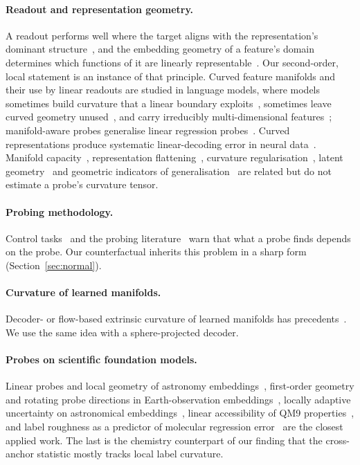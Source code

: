 \documentclass[10pt]{article}
\begin{document}
\paragraph{Readout and representation geometry.} A readout performs well where the target aligns with the representation's dominant structure~\citep{canatar2021spectral}, and the embedding geometry of a feature's domain determines which functions of it are linearly representable~\citep{yocum2026neural}. Our second-order, local statement is an instance of that principle. Curved feature manifolds and their use by linear readouts are studied in language models, where models sometimes build curvature that a linear boundary exploits~\citep{gurnee2026manipulate}, sometimes leave curved geometry unused~\citep{hindupur2026dont}, and carry irreducibly multi-dimensional features~\citep{engels2024notall}; manifold-aware probes generalise linear regression probes~\citep{modell2026probing}. Curved representations produce systematic linear-decoding error in neural data~\citep{jurewicz2024irrational}. Manifold capacity~\citep{chung2016linear,slatton2026linear}, representation flattening~\citep{psenka2024flattening}, curvature regularisation~\citep{ma2023curvature}, latent geometry~\citep{kaufman2023latent} and geometric indicators of generalisation~\citep{chou2026diagnosing} are related but do not estimate a probe's curvature tensor.

\paragraph{Probing methodology.} Control tasks~\citep{hewitt2019control} and the probing literature~\citep{belinkov2022probing} warn that what a probe finds depends on the probe. Our counterfactual inherits this problem in a sharp form (Section~\ref{sec:normal}).

\paragraph{Curvature of learned manifolds.} Decoder- or flow-based extrinsic curvature of learned manifolds has precedents~\citep{lee2023curvature,acosta2023extrinsic}. We use the same idea with a sphere-projected decoder.

\paragraph{Probes on scientific foundation models.} Linear probes and local geometry of astronomy embeddings~\citep{duraphe2025platonic}, first-order geometry and rotating probe directions in Earth-observation embeddings~\citep{rahman2026alphaearth}, locally adaptive uncertainty on astronomical embeddings~\citep{tamenarvaez2026beyond}, linear accessibility of QM9 properties~\citep{steier2026routing}, and label roughness as a predictor of molecular regression error~\citep{aldeghi2022roughness} are the closest applied work. The last is the chemistry counterpart of our finding that the cross-anchor statistic mostly tracks local label curvature.
\end{document}
